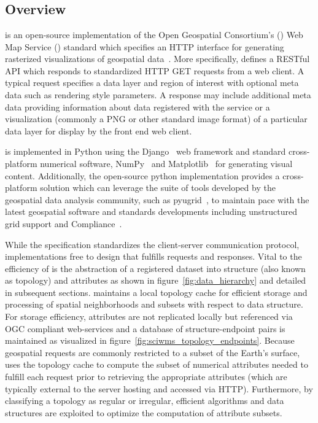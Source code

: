 \section{\sciwms{}}
\label{sec:sciwms}

\subsection{Overview}
\label{sec:overview}
\Sciwms{} is an open-source implementation of the Open Geospatial
Consortium's (\ogc{}) Web Map Service (\wms{}) standard which
specifies an HTTP interface for generating rasterized visualizations
of geospatial data~\cite{wms14}. More specifically, \wms{} defines a
RESTful API which responds to standardized HTTP GET requests from a
web client. A typical \wms{} request specifies a data layer and region
of interest with optional meta data such as rendering style
parameters. A \wms{} response may include additional meta data
providing information about data registered with the service or a
visualization (commonly a PNG or other standard image format) of a
particular data layer for display by the front end web client.

\sciwms{} is implemented in Python using the Django~\cite{django} web
framework and standard cross-platform numerical software,
NumPy~\cite{numpy11} and Matplotlib~\cite{hunter07} for generating
visual content. Additionally, the open-source python implementation
provides a cross-platform \wms{} solution which can leverage the suite
of tools developed by the geospatial data analysis community, such as
pyugrid~\cite{pyugrid}, to maintain pace with the latest geospatial
software and standards developments including unstructured grid
support and \cfugrid{} Compliance~\cite{cfugrid}.

While the \ogc{} \wms{} specification standardizes the client-server
communication protocol, \wms{} implementations free to design that
fulfills \wms{} requests and responses. Vital to the efficiency of
\sciwms{} is the abstraction of a registered dataset into structure
(also known as topology) and attributes as shown in
figure~\ref{fig:data_hierarchy} and detailed in subsequent
sections. \Sciwms{} maintains a local topology cache for efficient
storage and processing of spatial neighborhoods and subsets with
respect to data structure. For storage efficiency, attributes are not
replicated locally but referenced via OGC compliant web-services and a
database of structure-endpoint pairs is maintained as visualized in
figure~\ref{fig:sciwms_topology_endpoints}. Because geospatial \wms{}
requests are commonly restricted to a subset of the Earth's surface,
\sciwms{} uses the topology cache to compute the subset of numerical
attributes needed to fulfill each request prior to retrieving the
appropriate attributes (which are typically external to the server
hosting \sciwms{} and accessed via HTTP). Furthermore, by classifying
a topology as regular or irregular, efficient algorithms and data
structures are exploited to optimize the computation of attribute subsets.
